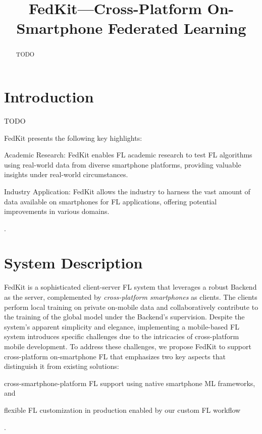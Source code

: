 \documentclass[letterpaper]{article} %
\title{FedKit---Cross-Platform On-Smartphone Federated Learning}
\author{}
\begin{document}
\maketitle

\begin{abstract}
    TODO
\end{abstract}

\section{Introduction}


TODO

FedKit presents the following key highlights:

\begin{enumerate*}[label=\arabic*)]
    \item Academic Research: FedKit enables FL academic research to test FL algorithms using real-world data from diverse smartphone platforms, providing valuable insights under real-world circumstances.
    \item Industry Application: FedKit allows the industry to harness the vast amount of data available on smartphones for FL applications, offering potential improvements in various domains.
\end{enumerate*}.


\section{System Description}

FedKit is a sophisticated client-server FL system that leverages a robust Backend as the server, complemented by \textit{cross-platform smartphones} as clients.
The clients perform local training on private on-mobile data and collaboratively contribute to the training of the global model under the Backend's supervision.
Despite the system's apparent simplicity and elegance, implementing a mobile-based FL system introduces specific challenges due to the intricacies of cross-platform mobile development.
To address these challenges, we propose FedKit to support cross-platform on-smartphone FL that emphasizes two key aspects that distinguish it from existing solutions:
\begin{enumerate*}[label=\arabic*)]
    \item cross-smartphone-platform FL support using
        native smartphone ML frameworks, and
    \item flexible FL customization in production enabled by
        our custom FL workflow
\end{enumerate*}.
\end{document}
